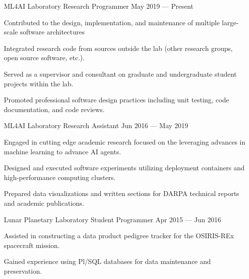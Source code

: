 
\vspace{-0.2cm}
\begin{cventries}

  \cventry
    {ML4AI Laboratory} %
    {Research Programmer} %
    {May 2019 --- Present} %
    {} %
    {
      \begin{cvitems} %
        \item Contributed to the design, implementation, and maintenance of multiple large-scale software architectures
        \item Integrated research code from sources outside the lab (other research groups, open source software, etc.).
        \item Served as a supervisor and consultant on graduate and undergraduate student projects within the lab.
        \item Promoted professional software design practices including unit testing, code documentation, and code reviews.
      \end{cvitems}
    }

  \cventry
    {ML4AI Laboratory} %
    {Research Assistant} %
    {Jun 2016 --- May 2019} %
    {} %
    {
      \begin{cvitems} %
        \item Engaged in cutting edge academic research focused on the leveraging advances in machine learning to advance AI agents.
        \item Designed and executed software experiments utilizing deployment containers and high-performance computing clusters.
        \item Prepared data visualizations and written sections for DARPA technical reports and academic publications.
      \end{cvitems}
    }

  \cventry
    {Lunar Planetary Laboratory} %
    {Student Programmer} %
    {Apr 2015 --- Jun 2016} %
    {} %
    {
      \begin{cvitems} %
        \item Assisted in constructing a data product pedigree tracker for the OSIRIS-REx spacecraft mission.
        \item Gained experience using Pl/SQL databases for data maintenance and preservation.
      \end{cvitems}
    }

\end{cventries}
